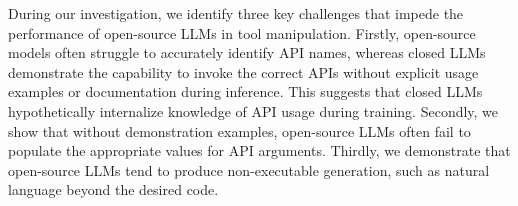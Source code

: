 During our investigation, we identify three key challenges that impede the performance of open-source LLMs in tool manipulation. 
Firstly, open-source models often struggle to accurately identify API names, whereas closed LLMs demonstrate the capability to invoke the correct APIs without explicit usage examples or documentation during inference. 
This suggests that closed LLMs hypothetically internalize knowledge of API usage during training. 
Secondly, we show that without demonstration examples, open-source LLMs often fail to populate the appropriate values for API arguments. 
Thirdly, we demonstrate that open-source LLMs tend to produce non-executable generation, such as natural language beyond the desired code. 

